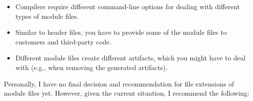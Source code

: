 \begin{itemize}
\item 
Compilers require different command-line options for dealing with different types of module files.

\item 
Similar to header files, you have to provide some of the module files to customers and third-party code.

\item 
Different module files create different artifacts, which you might have to deal with (e.g., when removing the generated artifacts).
\end{itemize}

Personally, I have no final decision and recommendation for file extensions of module files yet. However, given the current situation, I recommend the following:

